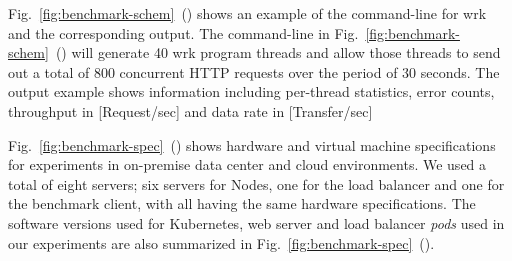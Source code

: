Fig.~\ref{fig:benchmark-schem}~() shows an example of the command-line for wrk and the corresponding output.
The command-line in Fig.~\ref{fig:benchmark-schem}~() will generate 40 wrk program threads
and allow those threads to send out a total of 800 concurrent HTTP requests over the period of 30 seconds.
The output example shows information including per-thread statistics, error counts, throughput in [Request/sec] and data rate in [Transfer/sec]

Fig.~\ref{fig:benchmark-spec}~() shows hardware and virtual machine specifications for experiments in on-premise data center and cloud environments.
We used a total of eight servers; six servers for Nodes, one for the load balancer and one for the benchmark client, with all having the same hardware specifications.
The software versions used for Kubernetes, web server and load balancer {\em pods} used in our experiments are also summarized in Fig.~\ref{fig:benchmark-spec}~().

